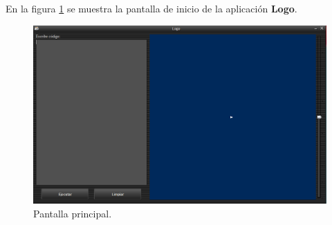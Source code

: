 En la figura \ref{fig:screen:1} se muestra la pantalla de inicio de la aplicación \textbf{Logo}.

\begin{figure}[H]
	\begin{center}
		\includegraphics[scale=.5]{images/pantallas/img_pantalla_inicio}
		\caption{Pantalla principal.}
		\label{fig:screen:1}
	\end{center}
\end{figure}